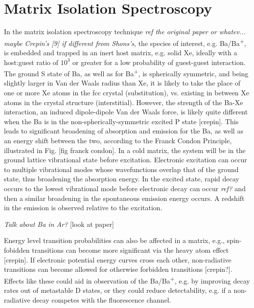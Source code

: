 \section{Matrix Isolation Spectroscopy}


In the matrix isolation spectroscopy technique \emph{\color{gray}ref the original paper or whatev... maybe Crepin's [9] if different from Shons's}, the species of interest, e.g. Ba/Ba\textsuperscript{+}, is embedded and trapped in an inert host matrix, e.g. solid Xe, ideally with a host:guest ratio of $10^{3}$ or greater for a low probability of guest-guest interaction.  The ground S state of Ba, as well as for Ba\textsuperscript{+}, is spherically symmetric, and being slightly larger in Van der Waals radius than Xe, it is likely to take the place of one or more Xe atoms in the fcc crystal (substitution), vs. existing in between Xe atoms in the crystal structure (interstitial).  However, the strength of the Ba-Xe interaction, an induced dipole-dipole Van der Waals force, is likely quite different when the Ba is in the non-spherically-symmetric excited P state [crepin].  This leads to significant broadening of absorption and emission for the Ba, as well as an energy shift between the two, according to the Franck Condon Principle, illustrated in Fig. [fig franck condon].  In a cold matrix, the system will be in the ground lattice vibrational state before excitation.  Electronic excitation can occur to multiple vibrational modes whose wavefunctions overlap that of the ground state, thus broadening the absorption energy.  In the excited state, rapid decay occurs to the lowest vibrational mode before electronic decay can occur \emph{\color{gray}ref?} and then a similar broadening in the spontaneous emission energy occurs.  A redshift in the emission is observed relative to the excitation.


\emph{\color{gray}Talk about Ba in Ar?} {\color{red}[look at paper]}

Energy level transition probabilities can also be affected in a matrix, e.g., spin-fobidden transitions can become more significant via the heavy atom effect [crepin].  If electronic potential energy curves cross each other, non-radiative transitions can become allowed for otherwise forbidden transitions [crepin?].  Effects like these could aid in observation of the Ba/Ba\textsuperscript{+}, e.g. by improving decay rates out of metastable D states, or they could reduce detectability, e.g. if a non-radiative decay competes with the fluorescence channel.


